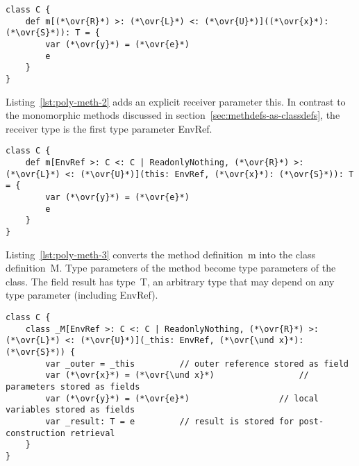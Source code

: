 \begin{lstlisting}[float=htbp, caption={Polymorphic Method Transformation 1}, label={lst:poly-meth-1}]
class C {
	def m[(*\ovr{R}*) >: (*\ovr{L}*) <: (*\ovr{U}*)]((*\ovr{x}*): (*\ovr{S}*)): T = {
		var (*\ovr{y}*) = (*\ovr{e}*)
		e
	}
}
\end{lstlisting}

Listing~\ref{lst:poly-meth-2} adds an explicit receiver parameter {\cd this}. In contrast to the monomorphic methods discussed in section~\ref{sec:methdefs-as-classdefs}, the receiver type is the first type parameter {\cd EnvRef}.

\begin{lstlisting}[float=htbp, caption={Polymorphic Method Transformation 2 (Explicit This)}, label={lst:poly-meth-2}]
class C {
	def m[EnvRef >: C <: C | ReadonlyNothing, (*\ovr{R}*) >: (*\ovr{L}*) <: (*\ovr{U}*)](this: EnvRef, (*\ovr{x}*): (*\ovr{S}*)): T = {
		var (*\ovr{y}*) = (*\ovr{e}*)
		e
	}
}
\end{lstlisting}

Listing~\ref{lst:poly-meth-3} converts the method definition~{\cd m} into the class definition~{\cd \und M}. Type parameters of the method become type parameters of the class. The field {\cd \und result} has type~{\cd T}, an arbitrary type that may depend on any type parameter (including {\cd EnvRef}).

\begin{lstlisting}[float=htbp, caption={Polymorphic Method Transformation 3 (Closure)}, label={lst:poly-meth-3}]
class C {
	class _M[EnvRef >: C <: C | ReadonlyNothing, (*\ovr{R}*) >: (*\ovr{L}*) <: (*\ovr{U}*)](_this: EnvRef, (*\ovr{\und x}*): (*\ovr{S}*)) {
		var _outer = _this         // outer reference stored as field
		var (*\ovr{x}*) = (*\ovr{\und x}*)                 // parameters stored as fields
		var (*\ovr{y}*) = (*\ovr{e}*)                  // local variables stored as fields
		var _result: T = e         // result is stored for post-construction retrieval
	}
}
\end{lstlisting}


